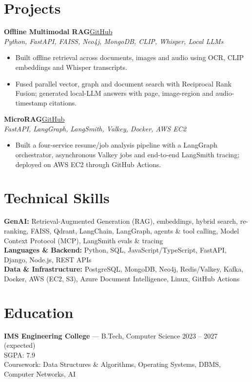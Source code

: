 \documentclass[letterpaper,10pt]{article}
\newcommand{\entry}[4]{%
  \textbf{#1}\hfill #2\\
  \textit{#3}\hfill #4\par
}
\begin{document}
\section*{Projects}
\entry{Offline Multimodal RAG}{\href{https://github.com/mukulpythondev/sih}{GitHub}}{Python, FastAPI, FAISS, Neo4j, MongoDB, CLIP, Whisper, Local LLMs}{}
\begin{itemize}
  \item Built offline retrieval across documents, images and audio using OCR, CLIP embeddings and Whisper transcripts.
  \item Fused parallel vector, graph and document search with Reciprocal Rank Fusion; generated local-LLM answers with page, image-region and audio-timestamp citations.
\end{itemize}
\vspace{3pt}
\entry{MicroRAG}{\href{https://github.com/mukulpythondev/microRAG}{GitHub}}{FastAPI, LangGraph, LangSmith, Valkey, Docker, AWS EC2}{}
\begin{itemize}
  \item Built a four-service resume/job analysis pipeline with a LangGraph orchestrator, asynchronous Valkey jobs and end-to-end LangSmith tracing; deployed on AWS EC2 through GitHub Actions.
\end{itemize}

\section*{Technical Skills}
\textbf{GenAI:} Retrieval-Augmented Generation (RAG), embeddings, hybrid search, re-ranking, FAISS, Qdrant, LangChain, LangGraph, agents \& tool calling, Model Context Protocol (MCP), LangSmith evals \& tracing\\[2pt]
\textbf{Languages \& Backend:} Python, SQL, JavaScript/TypeScript, FastAPI, Django, Node.js, REST APIs\\[2pt]
\textbf{Data \& Infrastructure:} PostgreSQL, MongoDB, Neo4j, Redis/Valkey, Kafka, Docker, AWS (EC2, S3), Azure Document Intelligence, Linux, GitHub Actions

\section*{Education}
\textbf{IMS Engineering College} --- B.Tech, Computer Science \hfill 2023 -- 2027 (expected)\\
SGPA: 7.9\\
Coursework: Data Structures \& Algorithms, Operating Systems, DBMS, Computer Networks, AI
\end{document}
